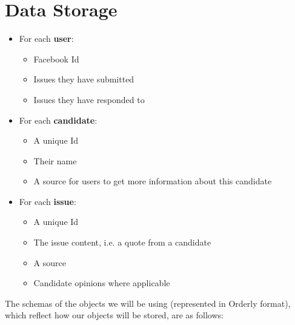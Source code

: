 \documentclass[11pt]{article}
\begin{document}
\section{Data Storage}

\begin{itemize}[nolistsep]
    \item[] For each \textbf{user}:
    \begin{itemize}[nolistsep]
        \item Facebook Id
        \item Issues they have submitted
        \item Issues they have responded to
    \end{itemize}

    \item[] For each \textbf{candidate}:
    \begin{itemize}[nolistsep]
        \item A unique Id
        \item Their name
        \item A source for users to get more information about this candidate
    \end{itemize}

    \item[] For each \textbf{issue}:
    \begin{itemize}[nolistsep]
        \item A unique Id
        \item The issue content, i.e. a quote from a candidate
        \item A source
        \item Candidate opinions where applicable
    \end{itemize}
\end{itemize}

\vspace{10pt}

The schemas of the objects we will be using (represented in Orderly format), which reflect how our objects will be stored, are as follows:\\
\end{document}
